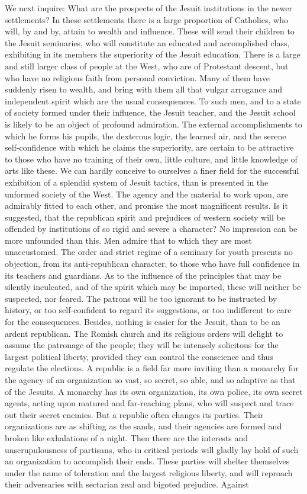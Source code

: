\documentclass[]{book}
\begin{document}
We next inquire: What are the prospects of the Jesuit institutions in the newer settlements? In these settlements there is a large proportion of Catholics, who will, by and by, attain to wealth and influence. These will send their children to the Jesuit seminaries, who will constitute an educated and accomplished class, exhibiting in its members the superiority of the Jesuit education. There is a large and still larger class of people at the West, who are of Protestant descent, but who have no religious faith from personal conviction. Many of them have suddenly risen to wealth, and bring with them all that vulgar arrogance and independent spirit which are the usual consequences. To such men, and to a state of society formed under their influence, the Jesuit teacher, and the Jesuit school is likely to be an object of profound admiration. The external accomplishments to which he forms his pupils, the dexterous logic, the learned air, and the serene self-confidence with which he claims the superiority, are certain to be attractive to those who have no training of their own, little culture, and little knowledge of arts like these. We can hardly conceive to ourselves a finer field for the successful exhibition of a splendid system of Jesuit tactics, than is presented in the unformed society of the West. The agency and the material to work upon, are admirably fitted to each other, and promise the most magnificent results. Is it suggested, that the republican spirit and prejudices of western society will be offended by institutions of so rigid and severe a character? No impression can be more unfounded than this. Men admire that to which they are most unaccustomed. The order and strict regime of a seminary for youth presents no objection, from its anti-republican character, to those who have full confidence in its teachers and guardians. As to the influence of the principles that may be silently inculcated, and of the spirit which may be imparted, these will neither be suspected, nor feared. The patrons will be too ignorant to be instructed by history, or too self-confident to regard its suggestions, or too indifferent to care for the consequences. Besides, nothing is easier for the Jesuit, than to be an ardent republican. The Romish church and its religious orders will delight to assume the patronage of the people; they will be intensely solicitous for the largest political liberty, provided they can control the conscience and thus regulate the elections. A republic is a field far more inviting than a monarchy for the agency of an organization so vast, so secret, so able, and so adaptive as that of the Jesuits. A monarchy has its own organization, its own police, its own secret agents, acting upon matured and far-reaching plans, who will suspect and trace out their secret enemies. But a republic often changes its parties. Their organizations are as shifting as the sands, and their agencies are formed and broken like exhalations of a night. Then there are the interests and unscrupulousness of partisans, who in critical periods will gladly lay hold of such an organization to accomplish their ends. These parties will shelter themselves under the name of toleration and the largest religious liberty, and will reproach their adversaries with sectarian zeal and bigoted prejudice. Against 
\end{document}
